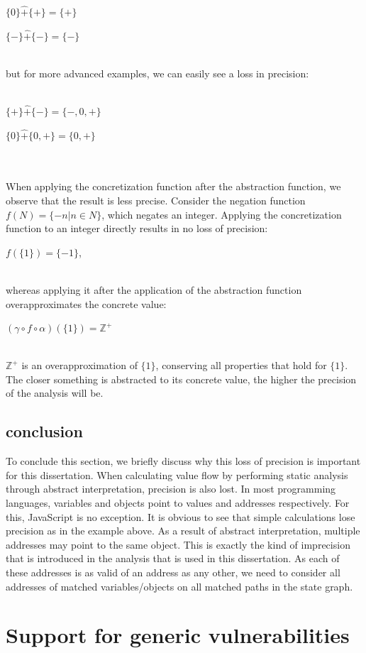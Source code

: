 \centerline{$\{0\}  \hat{+}  \{+\} = \{+\}$}
\centerline{$\{-\}  \hat{+}  \{-\} = \{-\}$}
\leavevmode \\
but for more advanced examples, we can easily see a loss in precision:\\\\
\centerline{$\{+\}  \hat{+}  \{-\} = \{-,0,+\}$}
\centerline{$\{0\}  \hat{+}  \{0,+\} = \{0,+\}$}
\\\\
When applying the concretization function after the abstraction function, we observe that the result is less precise. Consider the negation function $f(N) = \{-n \vert n \in N\}$, which negates an integer. Applying the concretization function to an integer directly results in no loss of precision:\\ 
\centerline{$f(\{1\}) = \{-1\}$,}\\ whereas applying it after the application of the abstraction function overapproximates the concrete value: \\
\centerline{$(\gamma \circ f \circ \alpha)(\{1\}) = \mathbb{Z}^+$}\\
$\mathbb{Z}^+$ is an overapproximation of $\{1\}$, conserving all properties that hold for $\{1\}$. The closer something is abstracted to its concrete value, the higher the precision of the analysis will be.

\subsection{conclusion}
To conclude this section, we briefly discuss why this loss of precision is important for this dissertation. When calculating value flow by performing static analysis through abstract interpretation, precision is also lost. In most programming languages, variables and objects point to values and addresses respectively. For this, JavaScript is no exception. It is obvious to see that simple calculations lose precision as in the example above. As a result of abstract interpretation, multiple addresses may point to the same object. This is exactly the kind of imprecision that is introduced in the analysis that is used in this dissertation. As each of these addresses is as valid of an address as any other, we need to consider all addresses of matched variables/objects on all matched paths in the state graph.

\section{Support for generic vulnerabilities}
\label{sec:genericVulnerabilities}


